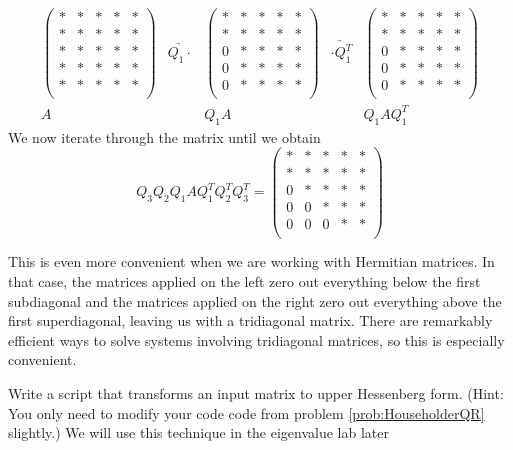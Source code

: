 \[
\begin{array}{ccccc}
\begin{pmatrix}
* & * & * & * & *\\
* & * & * & * & *\\
* & * & * & * & *\\
* & * & * & * & *\\
* & * & * & * & *\\
\end{pmatrix} 
&\underrightarrow{Q_1 \cdot }&
\begin{pmatrix}
* & * & * & * & *\\
* & * & * & * & *\\
0 & * & * & * & *\\
0 & * & * & * & *\\
0 & * & * & * & *\\
\end{pmatrix} 
&\underrightarrow{\cdot Q_1^T }&
\begin{pmatrix}
* & * & * & * & *\\
* & * & * & * & *\\
0 & * & * & * & *\\
0 & * & * & * & *\\
0 & * & * & * & *\\
\end{pmatrix}
\\ 
A & & Q_1A & & Q_1 A Q_1^T
  \end{array}
\]
We now iterate through the matrix until we obtain
\begin{equation*}
Q_3 Q_2 Q_1 A Q_1^T Q_2 ^T Q_3^T = 
\begin{pmatrix}
* & * & * & * & *\\
* & * & * & * & *\\
0 & * & * & * & *\\
0 & 0 & * & * & *\\
0 & 0 & 0 & * & *\\
\end{pmatrix}
\end{equation*}

This is even more convenient when we are working with Hermitian matrices.
In that case, the matrices applied on the left zero out everything below the first subdiagonal and the matrices applied on the right zero out everything above the first superdiagonal, leaving us with a tridiagonal matrix.
There are remarkably efficient ways to solve systems involving tridiagonal matrices, so this is especially convenient.

\begin{problem}
Write a script that transforms an input matrix to upper Hessenberg form.
(Hint: You only need to modify your code code from problem \ref{prob:HouseholderQR} slightly.)
We will use this technique in the eigenvalue lab later
\end{problem}

